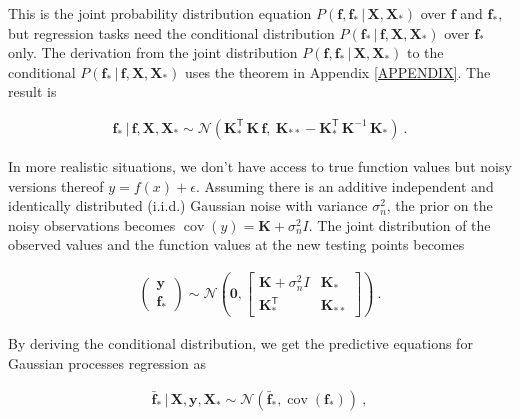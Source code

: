 \documentclass[12pt,letterpaper,fleqn,oneside,titlepage]{offroad-report}
\begin{document}
This is the joint probability distribution equation $P(\mathbf{f}, \mathbf{f}_* \, \vert \, \mathbf{X}, \mathbf{X}_*)$ over $\mathbf{f}$ and $\mathbf{f}_*$, but regression tasks need the conditional distribution $P(\mathbf{f}_* \, \vert \, \mathbf{f}, \mathbf{X}, \mathbf{X}_*)$ over $\mathbf{f}_*$ only. The derivation from the joint distribution $P(\mathbf{f}, \mathbf{f}_* \, \vert \, \mathbf{X}, \mathbf{X}_*)$ to the conditional $P(\mathbf{f}_* \, \vert \, \mathbf{f}, \mathbf{X}, \mathbf{X}_*)$ uses the theorem in Appendix \ref{APPENDIX}. The result is
\begin{ceqn}
    \begin{align}
       \mathbf{f}_* \, \vert \, \mathbf{f}, \mathbf{X}, \mathbf{X}_* \sim \mathcal{N} \left(\mathbf{K}_*^\mathsf{T} \, \mathbf{K} \, \mathbf{f}, \: \mathbf{K}_{**} - \mathbf{K}_*^\mathsf{T} \, \mathbf{K}^{-1} \, \mathbf{K}_* \right) \ . \nonumber
    \end{align}
\end{ceqn}
In more realistic situations, we don't have access to true function values but noisy versions thereof $y = f(x) + \epsilon$. Assuming there is an additive independent and identically distributed (i.i.d.) Gaussian noise with variance $\sigma_n^2$, the prior on the noisy observations becomes $\operatorname{cov}(y) = \mathbf{K} + \sigma_n^2 {I}$. The joint distribution of the observed values and the function values at the new testing points becomes
\begin{ceqn}
    \begin{align}
       \begin{pmatrix}\mathbf{y} \\ \mathbf{f}_*\end{pmatrix} \sim\mathcal{N}\left(\mathbf{0}, \begin{bmatrix}\mathbf{K} + \sigma_n^2 {I} & \mathbf{K}_* \\ \mathbf{K}_*^\mathsf{T} & \mathbf{K}_{**}\end{bmatrix}\right) \ . \nonumber
    \end{align}
\end{ceqn}
By deriving the conditional distribution, we get the predictive equations for Gaussian processes regression as
\begin{ceqn}
    \begin{align}
       \mathbf{\bar{f}_*} \, \vert \, \mathbf{X}, \mathbf{y}, \mathbf{X}_* \sim \mathcal{N} \left(\mathbf{\bar{f}_*}, \operatorname{cov}(\mathbf{f}_*)\right) \ , \nonumber
    \end{align}
\end{ceqn}
\end{document}
